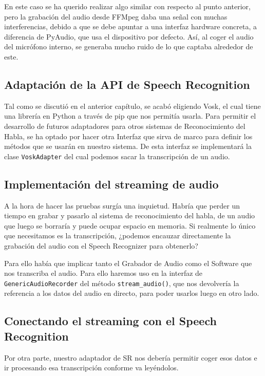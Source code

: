 En este caso se ha querido realizar algo similar con respecto al punto anterior, pero la grabación del audio desde FFMpeg daba una señal con muchas interferencias, debido a que se debe apuntar a una interfaz hardware concreta, a diferencia de PyAudio, que usa el dispositivo por defecto. Así, al coger el audio del micrófono interno, se generaba mucho ruido de lo que captaba alrededor de este.

\subsection{Adaptación de la API de Speech Recognition}
Tal como se discutió en el anterior capítulo, se acabó eligiendo Vosk\cite{vosk}, el cual tiene una librería en Python a través de pip que nos permitía usarla.
Para permitir el desarrollo de futuros adaptadores para otros sistemas de Reconocimiento del Habla, se ha optado por hacer otra Interfaz que sirva de marco para definir los métodos que se usarán en nuestro sistema.
De esta interfaz se implementará la clase \texttt{VoskAdapter} del cual podemos sacar la transcripción de un audio.

\subsection{Implementación del streaming de audio}
A la hora de hacer las pruebas surgía una inquietud. Habría que perder un tiempo en grabar y pasarlo al sistema de reconocimiento del habla, de un audio que luego se borraría y puede ocupar espacio en memoria. Si realmente lo único que necesitamos es la transcripción, ¿podemos encauzar directamente la grabación del audio con el Speech Recognizer para obtenerlo? 

Para ello había que implicar tanto el Grabador de Audio como el Software que nos transcriba el audio. Para ello haremos uso en la interfaz de \\ \texttt{GenericAudioRecorder} del método \texttt{stream\_audio()}, que nos devolvería la referencia a los datos del audio en directo, para poder usarlos luego en otro lado.

\subsection{Conectando el streaming con el Speech Recognition}
Por otra parte, nuestro adaptador de SR nos debería permitir coger esos datos e ir procesando esa transcripción conforme va leyéndolos.


